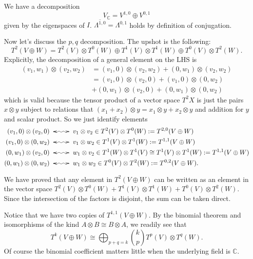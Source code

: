 \begin{lemma}
\label{lemma-i-eigenspace-decomposition}
We have a decomposition
$$
V_\mathbb{C}=V^{1,0}\oplus V^{0,1}
$$
given by the eigenspaces of $I$.
$\overline{\Lambda^{1,0}}=\Lambda^{0,1}$ holds by definition of conjugation.
\end{lemma}


Now let's discuss the $p,q$ decomposition.
The upshot is the following:
$$
T^2(V \oplus  W)=
T^2(V)\otimes T^0(W)
\oplus T^1(V)\otimes T^1(W)
\oplus T^0(V)\otimes T^2(W).
$$
Explicitly, the decomposition of a general element on the LHS is
\begin{align*}
(v_1,w_1)\otimes(v_2,w_2)
&=(v_1,0)\otimes(v_2,w_2)+(0,w_1)\otimes(v_2,w_2)\\
&=(v_1,0)\otimes(v_2,0)+(v_1,0)\otimes(0,w_2)\\
&+(0,w_1)\otimes(v_2,0)+(0,w_1)\otimes(0,w_2)
\end{align*}
which is valid because the tensor product of a vector space
$T^2X$ is just the pairs $x \otimes y$ subject
to relations that $(x_1+x_2)\otimes y=x_1 \otimes y+x_2\otimes y$
and addition for $y$ and scalar product.
So we just identify elements
\begin{align*}
(v_1,0)\otimes(v_2,0) &\xymatrix{\ar@{<~>}[r]&}
v_1 \otimes v_2 \in T^2(V) \otimes T^0(W):=T^{2,0}(V \oplus W)\\
(v_1,0)\otimes(0,w_2) &\xymatrix{\ar@{<~>}[r]&}
v_1 \otimes w_2 \in T^1(V) \otimes T^1(W):= T^{1,1}(V\oplus W)\\
(0,w_1)\otimes(v_2,0) &\xymatrix{\ar@{<~>}[r]&}
w_1 \otimes v_2 \in T^1(W) \otimes  T^1(V)
\cong T^1(V) \otimes  T^1(W):=T^{1,1}(V\oplus W)\\
(0,w_1)\otimes(0,w_2) &\xymatrix{\ar@{<~>}[r]&}
w_1\otimes w_2 \in T^0(V) \otimes T^2(W):=T^{0,2}(V \oplus  W).
\end{align*}

\noindent
We have proved that any element in $T^2(V \oplus W)$ 
can be written as an element in the vector space
$T^2(V)\otimes T^0(W)
+ T^1(V)\otimes T^1(W)
+ T^0(V)\otimes T^2(W)$.
Since the intersection of the factors is disjoint,
the sum can be taken direct.

\medskip\noindent
Notice that we have two copies of $T^{1,1}(V\oplus W)$.
By the binomial theorem and isomorphisms
of the kind $A \otimes B \cong B \otimes A$,
we readily see that
 $$
T^k(V \oplus W)
\cong \bigoplus_{p+q=k}\binom{k}{p}T^p(V)\otimes T^q(W).
$$
Of course the binomial coefficient matters little
when the underlying field is $\mathbb{C}$.

